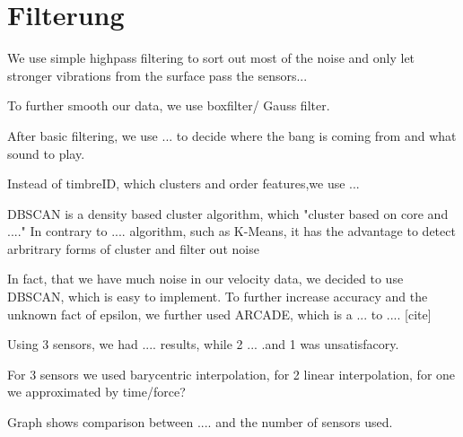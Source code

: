 \section{Filterung}

We use simple highpass filtering to sort out most of the noise and only let stronger vibrations from the surface pass the sensors... 

To further smooth our data, we use boxfilter/ Gauss filter.

After basic filtering, we use ... to decide where the bang is coming from and what sound to play.

Instead of timbreID, which clusters and order features,we use ... \cite{timbreID}

DBSCAN is a density based cluster algorithm, which "cluster based on core and ...."
In contrary to .... algorithm, such as K-Means, it has the advantage to detect arbritrary forms of cluster and filter out noise\cite{Elbatta2013ADM}

In fact, that we have much noise in our velocity data, we decided to use DBSCAN, which is easy to implement. 
To further increase accuracy and the unknown fact of epsilon, we further used ARCADE, which is a ... to .... [cite]

Using 3 sensors, we had .... results, while 2 ... .and 1 was unsatisfacory.

For 3 sensors we used barycentric interpolation, for 2 linear interpolation, for one we approximated by time/force? 


Graph shows comparison between .... and the number of sensors used.
